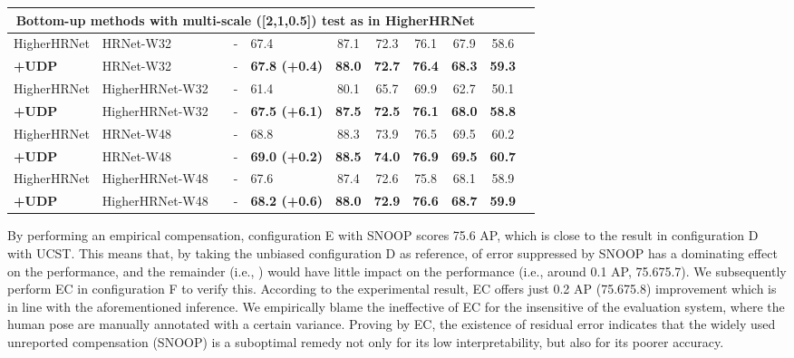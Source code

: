 \documentclass[10pt,journal,compsoc]{IEEEtran}
\begin{document}
\begin{table*}[t]
\begin{center}
\begin{tabular}{l|l|c|l|lcccccc}
\hline
\multicolumn{9}{c}{Bottom-up methods with multi-scale ([2,1,0.5]) test as in HigherHRNet \cite{Higher}}\\
\hline
HigherHRNet \cite{Higher}&HRNet-W32&               &-     &67.4                   & 87.1             & 72.3               & 76.1              &67.9                   &58.6\\
\textbf{+UDP}                     &HRNet-W32&               &-     &\textbf{67.8 (+0.4)}          & \textbf{88.0}    & \textbf{72.7}      & \textbf{76.4}     &\textbf{68.3}          &\textbf{59.3}\\
HigherHRNet \cite{Higher}&HigherHRNet-W32&         &-     &61.4                   & 80.1             & 65.7               & 69.9              &62.7                   &50.1\\
\textbf{+UDP}                     &HigherHRNet-W32&         &-     &\textbf{67.5 (+6.1)}          & \textbf{87.5}    & \textbf{72.5}      & \textbf{76.1}     &\textbf{68.0}          &\textbf{58.8}\\
HigherHRNet \cite{Higher}&HRNet-W48      &         &-     &68.8                   & 88.3             & 73.9               & 76.5              &69.5                   &60.2\\
\textbf{+UDP}                     &HRNet-W48      &         &-     &\textbf{69.0 (+0.2)}   & \textbf{88.5}    & \textbf{74.0}      & \textbf{76.9}     &\textbf{69.5}          &\textbf{60.7}\\
HigherHRNet \cite{Higher}         &HigherHRNet-W48&         &-     &67.6                   & 87.4             & 72.6               & 75.8              &68.1                   &58.9\\
\textbf{+UDP}                     &HigherHRNet-W48&         &-     &\textbf{68.2 (+0.6)}   & \textbf{88.0}    & \textbf{72.9}      & \textbf{76.6}     &\textbf{68.7}          &\textbf{59.9}\\
\hline
\end{tabular}
\end{center}
\end{table*}


By performing an empirical compensation, configuration E with SNOOP scores 75.6 AP, which is close to the result in configuration D with UCST. This means that, by taking the unbiased configuration D as reference,  of error  suppressed by SNOOP has a dominating effect on the performance, and the remainder (i.e., ) would have little impact on the performance (i.e., around 0.1 AP, 75.675.7). We subsequently perform EC in configuration F to verify this. According to the experimental result, EC offers just 0.2 AP (75.675.8) improvement which is in line with the aforementioned inference. We empirically blame the ineffective of EC for the insensitive of the evaluation system, where the human pose are manually annotated with a certain variance. Proving by EC, the existence of residual error  indicates that the widely used unreported compensation (SNOOP) is a suboptimal remedy not only for its low interpretability, but also for its poorer accuracy.
\end{document}
